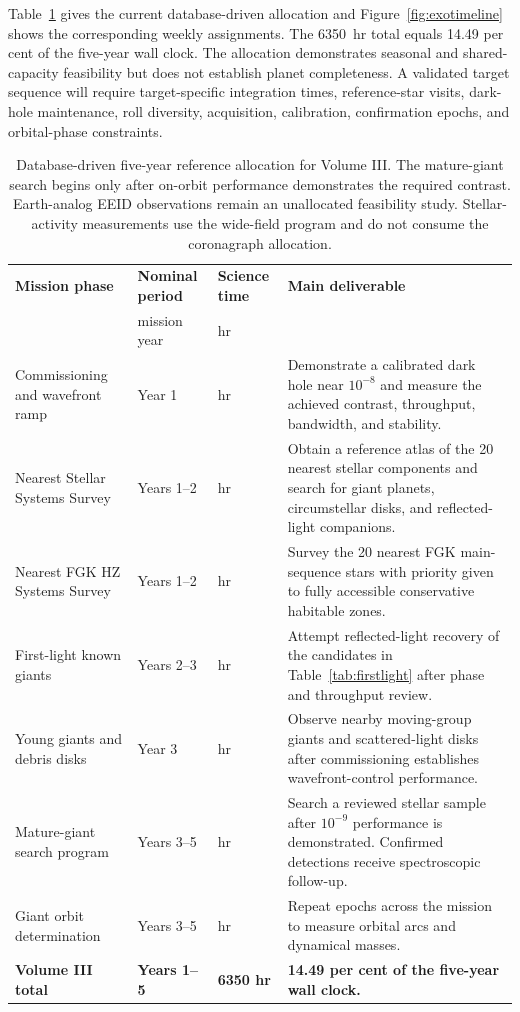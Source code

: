 Table~\ref{tab:exotimeline} gives the current database-driven allocation and
Figure~\ref{fig:exotimeline} shows the corresponding weekly assignments. The
6350~hr total equals 14.49 per cent of the five-year wall clock. The allocation
demonstrates seasonal and shared-capacity feasibility but does not establish
planet completeness. A validated target sequence will require target-specific
integration times, reference-star visits, dark-hole maintenance, roll
diversity, acquisition, calibration, confirmation epochs, and orbital-phase
constraints.

\begin{table}[tp]
\centering
\sffamily\small
\begin{tabularx}{\textwidth}{@{}
  >{\raggedright\arraybackslash}p{3.5cm}
  >{\raggedright\arraybackslash}p{2.15cm}
  >{\raggedright\arraybackslash}p{2.4cm}
  >{\raggedright\arraybackslash}X@{}}
\toprule
\textbf{Mission phase} & \textbf{Nominal period} & \textbf{Science time} & \textbf{Main deliverable}\\
 & mission year & hr & \\
\midrule
Commissioning and wavefront ramp & Year 1 & 400 hr & Demonstrate a calibrated dark hole near $10^{-8}$ and measure the achieved contrast, throughput, bandwidth, and stability.\\
Nearest Stellar Systems Survey & Years 1--2 & 400 hr & Obtain a reference atlas of the 20 nearest stellar components and search for giant planets, circumstellar disks, and reflected-light companions.\\
Nearest FGK HZ Systems Survey & Years 1--2 & 2000 hr & Survey the 20 nearest FGK main-sequence stars with priority given to fully accessible conservative habitable zones.\\
First-light known giants & Years 2--3 & 400 hr & Attempt reflected-light recovery of the candidates in Table~\ref{tab:firstlight} after phase and throughput review.\\
Young giants and debris disks & Year 3 & 350 hr & Observe nearby moving-group giants and scattered-light disks after commissioning establishes wavefront-control performance.\\
Mature-giant search program & Years 3--5 & 2000 hr & Search a reviewed stellar sample after $10^{-9}$ performance is demonstrated. Confirmed detections receive spectroscopic follow-up.\\
Giant orbit determination & Years 3--5 & 800 hr & Repeat epochs across the mission to measure orbital arcs and dynamical masses.\\
\midrule
\textbf{Volume III total} & \textbf{Years 1--5} & \textbf{6350 hr} & \textbf{14.49 per cent of the five-year wall clock.}\\
\bottomrule
\end{tabularx}
\caption{Database-driven five-year reference allocation for Volume III. The
mature-giant search begins only after on-orbit performance demonstrates the
required contrast. Earth-analog EEID observations remain an unallocated
feasibility study. Stellar-activity measurements use the wide-field program
and do not consume the coronagraph allocation.}
\label{tab:exotimeline}
\end{table}

